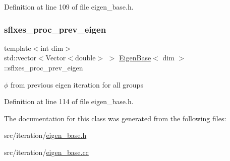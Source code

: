 Definition at line 109 of file eigen\+\_\+base.\+h.

\mbox{\label{class_eigen_base_aec9885df50ea40a18fd5708061139843}} 
\subsubsection{\texorpdfstring{sflxes\+\_\+proc\+\_\+prev\+\_\+eigen}{sflxes\_proc\_prev\_eigen}}
{\footnotesize\ttfamily template$<$int dim$>$ \\
std\+::vector$<$Vector$<$double$>$ $>$ \hyperlink{class_eigen_base}{Eigen\+Base}$<$ dim $>$\+::sflxes\+\_\+proc\+\_\+prev\+\_\+eigen\hspace{0.3cm}{\ttfamily [protected]}}



$\phi$ from previous eigen iteration for all groups 



Definition at line 114 of file eigen\+\_\+base.\+h.



The documentation for this class was generated from the following files\+:\begin{DoxyCompactItemize}
\item 
src/iteration/\hyperlink{eigen__base_8h}{eigen\+\_\+base.\+h}\item 
src/iteration/\hyperlink{eigen__base_8cc}{eigen\+\_\+base.\+cc}\end{DoxyCompactItemize}
